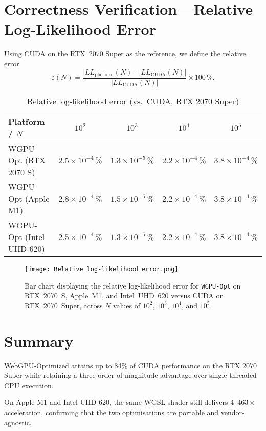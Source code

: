 \documentclass[PhD]{PHlab-thesis}
\begin{document}
\section{Correctness Verification—Relative Log-Likelihood Error}
Using CUDA on the RTX~2070 Super as the reference\cite{NVIDIA2019-rtx2070,NVIDIA2023-cudaguide}, we define the relative error
\[
  \varepsilon(N)=
  \frac{\lvert LL_{\text{platform}}(N)-LL_{\text{CUDA}}(N)\rvert}
       {\lvert LL_{\text{CUDA}}(N)\rvert}\times100\,\%.
\]

\begin{table}[h]
  \centering
  \caption{Relative log-likelihood error (vs.\ CUDA, RTX 2070 Super)}
  \label{tab:likelihood_error}
  \setlength{\tabcolsep}{6pt}
  \renewcommand{\arraystretch}{1.9}
  \small
  \begin{tabularx}{\textwidth}{@{}X c c c c@{}}
    \toprule
    Platform / $N$      & $10^{2}$ & $10^{3}$ & $10^{4}$ & $10^{5}$ \\
    \midrule
    WGPU-Opt (RTX 2070 S)  & $2.5\times10^{-4}\,\%$ & $1.3\times10^{-5}\,\%$ & $2.2\times10^{-4}\,\%$ & $3.8\times10^{-4}\,\%$ \\
    WGPU-Opt (Apple M1)    & $2.8\times10^{-4}\,\%$ & $1.5\times10^{-5}\,\%$ & $2.2\times10^{-4}\,\%$ & $3.8\times10^{-4}\,\%$ \\
    WGPU-Opt (Intel UHD 620)& $2.5\times10^{-4}\,\%$ & $1.3\times10^{-5}\,\%$ & $2.2\times10^{-4}\,\%$ & $3.8\times10^{-4}\,\%$ \\
    \bottomrule
  \end{tabularx}
\end{table}
\newpage
\begin{figure}
    \centering
    \texttt{[image: Relative log-likelihood error.png]}
    \caption{Bar chart displaying the relative log-likelihood error for \texttt{WGPU-Opt} on RTX~2070~S, Apple~M1, and Intel~UHD~620 versus CUDA on RTX~2070~Super, across $N$ values of $10^2$, $10^3$, $10^4$, and $10^5$.}
    \label{log-likelihood error}
\end{figure}

\section{Summary}
WebGPU-Optimized attains up to 84\% of CUDA performance on the RTX 2070 Super while retaining a three-order-of-magnitude advantage over single-threaded CPU execution\cite{Schmidt2024-gpuPairHMM}.  

On Apple M1 and Intel UHD 620, the same WGSL shader still delivers 4–463\,$\times$ acceleration, confirming that the two optimisations are portable and vendor-agnostic.  
\end{document}
